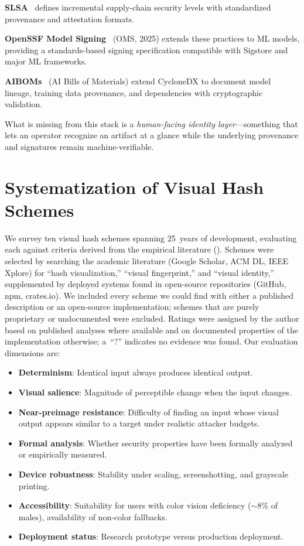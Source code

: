 \documentclass[conference,10pt]{IEEEtran}
\begin{document}
\noindent\textbf{SLSA}~\cite{slsa2023spec} defines incremental supply-chain security levels with standardized provenance and attestation formats.

\noindent\textbf{OpenSSF Model Signing}~\cite{openssf2025oms} (OMS, 2025) extends these practices to ML models, providing a standards-based signing specification compatible with Sigstore and major ML frameworks.

\noindent\textbf{AIBOMs}~\cite{aibom2026frontiers,owasp2025aibom} (AI Bills of Materials) extend CycloneDX to document model lineage, training data provenance, and dependencies with cryptographic validation.

What is missing from this stack is a \emph{human-facing identity layer}---something that lets an operator recognize an artifact at a glance while the underlying provenance and signatures remain machine-verifiable.

\section{Systematization of Visual Hash Schemes}
\label{sec:systematization}

We survey ten visual hash schemes spanning 25~years of development, evaluating each against criteria derived from the empirical literature ().
Schemes were selected by searching the academic literature (Google Scholar, ACM DL, IEEE Xplore) for ``hash visualization,'' ``visual fingerprint,'' and ``visual identity,'' supplemented by deployed systems found in open-source repositories (GitHub, npm, crates.io).
We included every scheme we could find with either a published description or an open-source implementation; schemes that are purely proprietary or undocumented were excluded.
Ratings were assigned by the author based on published analyses where available and on documented properties of the implementation otherwise; a~``?'' indicates no evidence was found.
Our evaluation dimensions are:

\begin{itemize}[leftmargin=*,nosep]
  \item \textbf{Determinism}: Identical input always produces identical output.
  \item \textbf{Visual salience}: Magnitude of perceptible change when the input changes.
  \item \textbf{Near-preimage resistance}: Difficulty of finding an input whose visual output appears similar to a target under realistic attacker budgets.
  \item \textbf{Formal analysis}: Whether security properties have been formally analyzed or empirically measured.
  \item \textbf{Device robustness}: Stability under scaling, screenshotting, and grayscale printing.
  \item \textbf{Accessibility}: Suitability for users with color vision deficiency (${\sim}$8\% of males), availability of non-color fallbacks.
  \item \textbf{Deployment status}: Research prototype versus production deployment.
\end{itemize}
\end{document}
